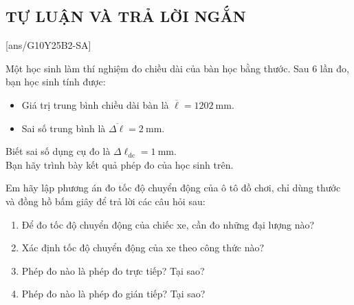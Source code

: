 \subsection{TỰ LUẬN VÀ TRẢ LỜI NGẮN}
\setcounter{ex}{0}
[ans/G10Y25B2-SA]
\begin{ex}
	Một học sinh làm thí nghiệm đo chiều dài của bàn học bằng thước. Sau 6 lần đo, bạn học sinh tính được:
	\begin{itemize}
		\item Giá trị trung bình chiều dài bàn là $\overline{\ell}=\SI{1202}{\milli\meter}$.
		\item Sai số trung bình là $\overline{\Delta\ell}=\SI{2}{\milli\meter}$.
	\end{itemize}
	Biết sai số dụng cụ đo là $\Delta \ell_\text{dc}=\SI{1}{\milli\meter}$.\\
	Bạn hãy trình bày kết quả phép đo của học sinh trên.
\end{ex}

\begin{ex}
	Em hãy lập phương án đo tốc độ chuyển động của ô tô đồ chơi, chỉ dùng thước và đồng hồ bấm giây để trả lời các câu hỏi sau:
	\begin{enumerate}[label=\alph*)]
		\item Để đo tốc độ chuyển động của chiếc xe, cần đo những đại lượng nào?
		\item Xác định tốc độ chuyển động của xe theo công thức nào?
		\item Phép đo nào là phép đo trực tiếp? Tại sao?
		\item Phép đo nào là phép đo gián tiếp? Tại sao?
	\end{enumerate}
\end{ex}

